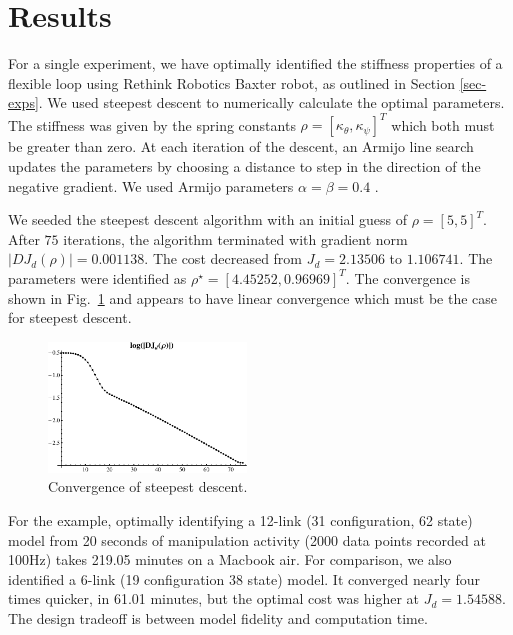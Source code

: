 \documentclass[runningheads,a4paper]{llncs}
\begin{document}



\section{Results}
For a single experiment, we have optimally identified the stiffness properties of a flexible loop using Rethink Robotics Baxter robot, as outlined in Section \ref{sec-exps}.  We used steepest descent to numerically calculate the optimal parameters.  The stiffness was given by the spring constants $\rho = [\kappa_\theta,\kappa_\psi]^T$ which both must be greater than zero.   At each iteration of the descent, an Armijo line search updates the parameters by choosing a distance to step in the direction of the negative gradient.  We used Armijo parameters $\alpha = \beta = 0.4$ \cite{armijo}.

We seeded the steepest descent algorithm with an initial guess of $\rho = [5, 5]^T$.  After $75$ iterations, the algorithm terminated with gradient norm $|DJ_d(\rho)| = 0.001138$.  The cost decreased from $J_d = 2.13506$ to $1.106741$.  The parameters were identified as $\rho^\star = [4.45252, 0.96969]^T$.  The convergence is shown in Fig.~\ref{fig-conv} and appears to have linear convergence which must be the case for steepest descent.

\begin{figure}
\centering
\includegraphics[width = 0.47\textwidth]{conv_12_links.pdf}
\caption{Convergence of steepest descent.}
\label{fig-conv}
\end{figure}

For the example, optimally identifying a 12-link  (31 configuration, 62 state) model from 20 seconds of manipulation activity (2000 data points recorded at 100Hz) takes 219.05 minutes on a Macbook air.  For comparison, we also identified a 6-link (19 configuration 38 state) model.  It converged nearly four times quicker, in 61.01 minutes, but the optimal cost was higher at $J_d = 1.54588$.  The design tradeoff is between model fidelity and computation time.
\end{document}
